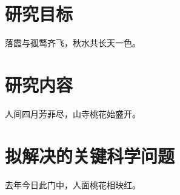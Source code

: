 \section{研究目标}

落霞与孤鹜齐飞，秋水共长天一色。

\section{研究内容}

人间四月芳菲尽，山寺桃花始盛开。

\section{拟解决的关键科学问题}

去年今日此门中，人面桃花相映红。
